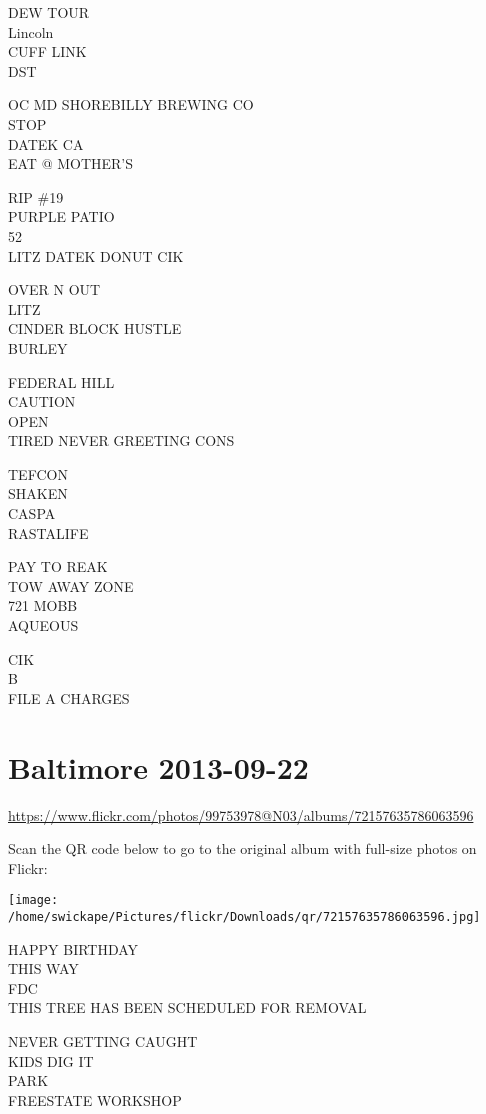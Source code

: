 \documentclass[10pt,letterpaper]{article}
\begin{document}
DEW TOUR\\
Lincoln\\
CUFF LINK\\
DST

OC MD SHOREBILLY BREWING CO\\
STOP\\
DATEK CA\\
EAT @ MOTHER'S

RIP \#19\\
PURPLE PATIO\\
52\\
LITZ DATEK DONUT CIK

OVER N OUT\\
LITZ\\
CINDER BLOCK HUSTLE\\
BURLEY

FEDERAL HILL\\
CAUTION\\
OPEN\\
TIRED NEVER GREETING CONS

TEFCON\\
SHAKEN\\
CASPA\\
RASTALIFE

PAY TO REAK\\
TOW AWAY ZONE\\
721 MOBB\\
AQUEOUS

CIK\\
B\\
FILE A CHARGES


\section*{Baltimore 2013-09-22}

\url{https://www.flickr.com/photos/99753978@N03/albums/72157635786063596}

Scan the QR code below to go to the original album with full-size photos on Flickr:

\texttt{[image: /home/swickape/Pictures/flickr/Downloads/qr/72157635786063596.jpg]}


HAPPY BIRTHDAY\\
THIS WAY\\
FDC\\
THIS TREE HAS BEEN SCHEDULED FOR REMOVAL

NEVER GETTING CAUGHT\\
KIDS DIG IT\\
PARK\\
FREESTATE WORKSHOP
\end{document}
